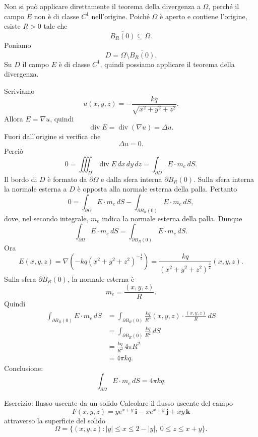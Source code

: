 \documentclass[a4paper]{article}
\begin{document}
\begin{radioactive}
\begin{snippetsolution}{}
    Non si può applicare direttamente il teorema della divergenza a \(\Omega\), perché il campo \(E\) non è di classe \(C^1\) nell'origine. Poiché \(\Omega\) è aperto e contiene l'origine, esiste \(R>0\) tale che
    \[
        \overline{B_R(0)}\subseteq\Omega.
    \]
    Poniamo
    \[
        D=\Omega\setminus\overline{B_R(0)}.
    \]
    Su \(D\) il campo \(E\) è di classe \(C^1\), quindi possiamo applicare il teorema della divergenza.

    Scriviamo
    \[
        u(x,y,z)=-\frac{kq}{\sqrt{x^2+y^2+z^2}}.
    \]
    Allora \(E=\nabla u\), quindi
    \[
        \operatorname{div}E=\operatorname{div}(\nabla u)=\Delta u.
    \]
    Fuori dall'origine si verifica che
    \[
        \Delta u=0.
    \]
    Perciò
    \[
        0=\iiint_D \operatorname{div}E\,dx\,dy\,dz
        =
        \int_{\partial D}E\cdot m_e\,dS.
    \]
    Il bordo di \(D\) è formato da \(\partial\Omega\) e dalla sfera interna \(\partial B_R(0)\). Sulla sfera interna la normale esterna a \(D\) è opposta alla normale esterna della palla. Pertanto
    \[
        0
        =
        \int_{\partial\Omega}E\cdot m_e\,dS
        -
        \int_{\partial B_R(0)}E\cdot m_e\,dS,
    \]
    dove, nel secondo integrale, \(m_e\) indica la normale esterna della palla. Dunque
    \[
        \int_{\partial\Omega}E\cdot m_e\,dS
        =
        \int_{\partial B_R(0)}E\cdot m_e\,dS.
    \]
    Ora
    \[
        E(x,y,z)
        =
        \nabla\left(-kq(x^2+y^2+z^2)^{-\frac12}\right)
        =
        \frac{kq}{(x^2+y^2+z^2)^{\frac32}}(x,y,z).
    \]
    Sulla sfera \(\partial B_R(0)\), la normale esterna è
    \[
        m_e=\frac{(x,y,z)}{R}.
    \]
    Quindi
    \begin{align*}
        \int_{\partial B_R(0)}E\cdot m_e\,dS
        &=\int_{\partial B_R(0)}
        \frac{kq}{R^3}(x,y,z)\cdot\frac{(x,y,z)}{R}\,dS \\
        &=\int_{\partial B_R(0)} \frac{kq}{R^2}\,dS \\
        &=\frac{kq}{R^2}\,4\pi R^2 \\
        &=4\pi kq.
    \end{align*}
    Conclusione:
    \[
        \int_{\partial\Omega}E\cdot m_e\,dS=4\pi kq.
    \]
\end{snippetsolution}
\end{radioactive}

\begin{radioactive}
\begin{snippetexample}{Esercizio: flusso uscente da un solido}
    Calcolare il flusso uscente del campo
    \[
        F(x,y,z)=y e^{x+y}\,\mathbf{i}-x e^{x+y}\,\mathbf{j}+xy\,\mathbf{k}
    \]
    attraverso la superficie del solido
    \[
        \Omega=\{(x,y,z): |y|\le x\le 2-|y|,\ 0\le z\le x+y\}.
    \]
\end{snippetexample}
\end{radioactive}
\end{document}
